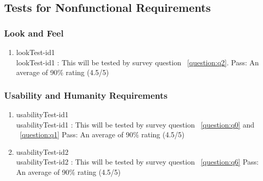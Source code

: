 \documentclass[12pt, titlepage]{article}
\begin{document}
\begin{enumerate}
\end{enumerate}

\subsection{Tests for Nonfunctional Requirements}

\subsubsection{Look and Feel}
\begin{enumerate}
\item{lookTest-id1\\}
lookTest-id1 : This will be tested by survey question ~\ref{question:q2}.
\newline
	Pass: An average of 90\% rating (4.5/5)


\end{enumerate}


\subsubsection{Usability and Humanity Requirements}
\begin{enumerate}
\item{usabilityTest-id1\\}
usabilityTest-id1 : This will be tested by survey question ~\ref{question:q0} and ~\ref{question:q1}
\newline
	Pass: An average of 90\% rating (4.5/5)

\item{usabilityTest-id2\\}
usabilityTest-id2 : This will be tested by survey question ~\ref{question:q6}
\newline
	Pass: An average of 90\% rating (4.5/5)


\end{enumerate}
\end{document}
